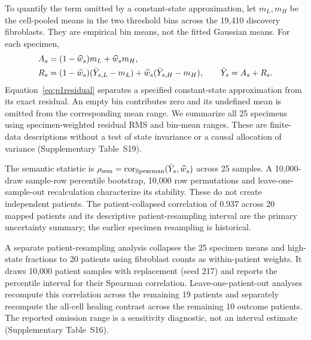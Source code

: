 \documentclass[10pt,a4paper]{article}
\begin{document}
To quantify the term omitted by a constant-state approximation, let $m_L,m_H$ be the cell-pooled means in the two threshold bins across the 19,410 discovery fibroblasts. They are empirical bin means, not the fitted Gaussian means. For each specimen,
\begin{align}
A_s&=(1-\widehat w_s)m_L+\widehat w_sm_H,\notag\\
R_s&=(1-\widehat w_s)(\bar Y_{s,L}-m_L)+\widehat w_s(\bar Y_{s,H}-m_H),\qquad \bar Y_s=A_s+R_s.\label{eq:p1residual}
\end{align}
Equation~\eqref{eq:p1residual} separates a specified constant-state approximation from its exact residual. An empty bin contributes zero and its undefined mean is omitted from the corresponding mean range. We summarize all 25 specimens using specimen-weighted residual RMS and bin-mean ranges. These are finite-data descriptions without a test of state invariance or a causal allocation of variance (Supplementary Table~S19).

The semantic statistic is $\rho_{\rm sem}=\operatorname{cor}_{\rm Spearman}(\bar Y_s,\widehat w_s)$ across 25 samples. A 10,000-draw sample-row percentile bootstrap, 10,000 row permutations and leave-one-sample-out recalculation characterize its stability. These do not create independent patients. The patient-collapsed correlation of 0.937 across 20 mapped patients and its descriptive patient-resampling interval are the primary uncertainty summary; the earlier specimen resampling is historical.

A separate patient-resampling analysis collapses the 25 specimen means and high-state fractions to 20 patients using fibroblast counts as within-patient weights. It draws 10,000 patient samples with replacement (seed 217) and reports the percentile interval for their Spearman correlation. Leave-one-patient-out analyses recompute this correlation across the remaining 19 patients and separately recompute the all-cell healing contrast across the remaining 10 outcome patients. The reported omission range is a sensitivity diagnostic, not an interval estimate (Supplementary Table~S16).
\end{document}
